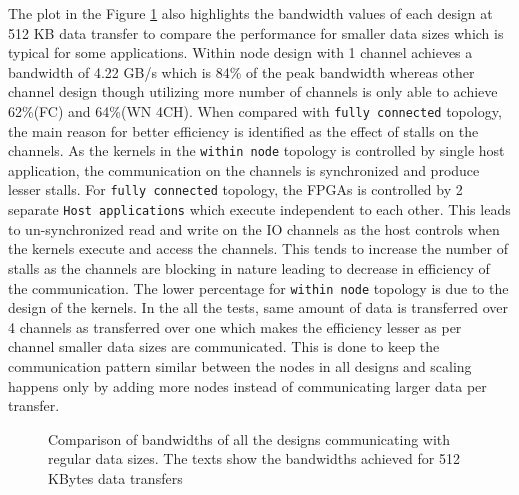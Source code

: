 The plot in the Figure \ref{plot:allreg} also highlights the bandwidth values
of each design at 512 KB data transfer to compare the performance for smaller data sizes which is typical
for some applications. Within node design with 1 channel achieves a bandwidth of 4.22 GB/s which is 84\%
of the peak bandwidth whereas other channel design though utilizing more number of channels is only able
to achieve 62\%(FC) and 64\%(WN 4CH). When compared with \texttt{fully connected} topology, the main reason
for better efficiency is identified as the effect of stalls on the channels. As the kernels in the
\texttt{within node} topology is controlled by single host application, the communication on the channels is
synchronized and produce lesser stalls. For \texttt{fully connected} topology, the FPGAs is controlled
by 2 separate \texttt{Host applications} which execute independent to each other. This leads to un-synchronized
read and write on the IO channels as the host controls when the kernels execute and access the channels.
This tends to increase the number of stalls as the channels are blocking in nature leading to decrease in
efficiency of the communication. The lower percentage for \texttt{within node} topology is due to the design of the
kernels. In the all the tests, same amount of data is transferred over 4 channels as transferred
over one which makes the efficiency lesser as per channel smaller data sizes are communicated. This
is done to keep the communication pattern similar between the nodes in all designs and scaling
happens only by adding more nodes instead of communicating larger data per transfer.
\begin{figure}[ht]
    \centering
    \scalebox{0.7}{}
    \caption{Comparison of bandwidths of all the designs communicating with regular data sizes.
    The texts show the bandwidths achieved for 512 KBytes data transfers}
    \label{plot:allreg}
\end{figure}

